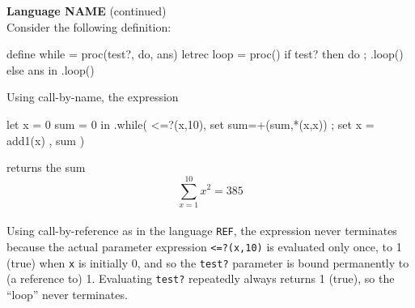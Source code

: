 \begin{minipage}[t]{\sw}
\slidenumber
\LARGE
{\bf Language NAME} (continued)\\[1.5ex]
Consider the following definition:
\Large
\begin{qv}
define while = proc(test?, do, ans)
  letrec loop = proc()
    if test? then {do ; .loop()} else ans
  in .loop()
\end{qv}
\LARGE
Using call-by-name, the expression
\Large
\begin{qv}
let x = 0 sum = 0 in
  .while(
    <=?(x,10),
    { set sum=+(sum,*(x,x)) ; set x = add1(x) },
    sum
  )
\end{qv}
\LARGE
returns the sum
\[\sum_{x=1}^{10} x^2 = 385\]\\
Using call-by-reference as in the language \verb'REF',
the expression never terminates
because the actual parameter expression \verb'<=?(x,10)'
is evaluated only once, to 1 (true) when \verb'x' is initially 0,
and so the \verb'test?' parameter is bound permanently to (a reference to) 1.
Evaluating \verb'test?' repeatedly always returns 1 (true),
so the ``loop'' never terminates.
\end{minipage}
